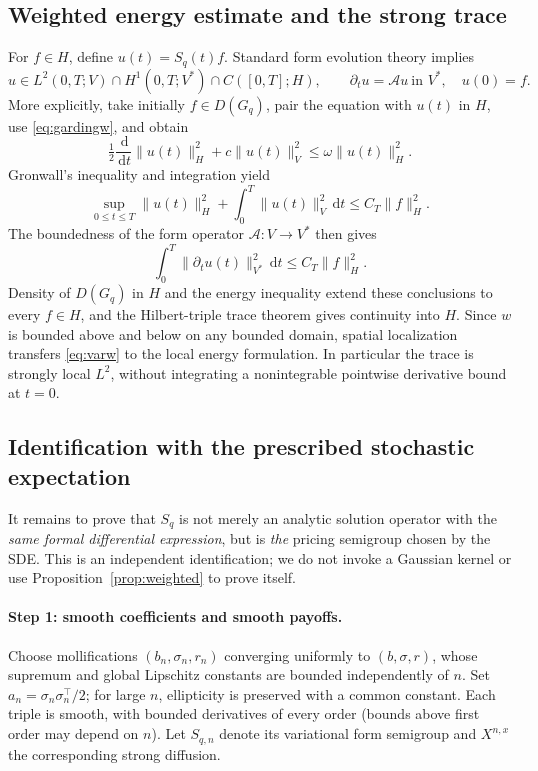 \documentclass[11pt,a4paper]{article}
\theoremstyle{definition}\newtheorem{definition}{Definition}[section]\newtheorem{example}[theorem]{Example}
\theoremstyle{remark}\newtheorem{remark}[theorem]{Remark}\newtheorem{remarkSix}{Remark}[section]
\newcommand{\dd}{\,\mathrm d}
\newcommand{\norm}[1]{\lVert #1\rVert}
\newcommand{\cA}{\mathcal A}
\begin{document}
\subsection{Weighted energy estimate and the strong trace}
\label{app:energy}
For $f\in H$, define $u(t)=S_q(t)f$. Standard form evolution theory implies
\begin{equation}\label{eq:varw}
 u\in L^2(0,T;V)\cap H^1(0,T;V^*)\cap C([0,T];H),
 \qquad \partial_tu=\cA u\ \text{in }V^*,\quad u(0)=f.
\end{equation}
More explicitly, take initially $f\in D(G_q)$, pair the equation with $u(t)$ in $H$, use \eqref{eq:gardingw}, and obtain
\begin{equation}\label{eq:energyder}
 \tfrac12\frac{\dd}{\dd t}\norm{u(t)}_H^2
 +c\norm{u(t)}_V^2\le\omega\norm{u(t)}_H^2.
\end{equation}
Gronwall's inequality and integration yield
\begin{equation}\label{eq:energyapp}
 \sup_{0\le t\le T}\norm{u(t)}_H^2
 +\int_0^T\norm{u(t)}_V^2\dd t\le C_T\norm f_H^2.
\end{equation}
The boundedness of the form operator $\cA:V\to V^*$ then gives
\begin{equation}\label{eq:timeapp}
 \int_0^T\norm{\partial_tu(t)}_{V^*}^2\dd t
 \le C_T\norm f_H^2.
\end{equation}
Density of $D(G_q)$ in $H$ and the energy inequality extend these conclusions to every $f\in H$, and the Hilbert-triple trace theorem gives continuity into $H$. Since $w$ is bounded above and below on any bounded domain, spatial localization transfers \eqref{eq:varw} to the local energy formulation. In particular the trace is strongly local $L^2$, without integrating a nonintegrable pointwise derivative bound at $t=0$.

\subsection{Identification with the prescribed stochastic expectation}
\label{app:FK}
It remains to prove that $S_q$ is not merely an analytic solution operator with the \emph{same formal differential expression}, but is \emph{the} pricing semigroup chosen by the SDE. This is an independent identification; we do not invoke a Gaussian kernel or use Proposition~\ref{prop:weighted} to prove itself.

\paragraph{Step 1: smooth coefficients and smooth payoffs.}
Choose mollifications $(b_n,\sigma_n,r_n)$ converging uniformly to $(b,\sigma,r)$, whose supremum and global Lipschitz constants are bounded independently of $n$. Set $a_n=\sigma_n\sigma_n^\top/2$; for large $n$, ellipticity is preserved with a common constant. Each triple is smooth, with bounded derivatives of every order (bounds above first order may depend on $n$). Let $S_{q,n}$ denote its variational form semigroup and $X^{n,x}$ the corresponding strong diffusion.
\end{document}
